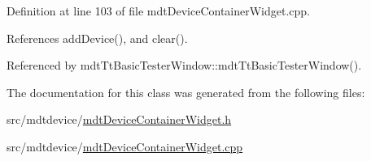 Definition at line 103 of file mdt\-Device\-Container\-Widget.\-cpp.



References add\-Device(), and clear().



Referenced by mdt\-Tt\-Basic\-Tester\-Window\-::mdt\-Tt\-Basic\-Tester\-Window().



The documentation for this class was generated from the following files\-:\begin{DoxyCompactItemize}
\item 
src/mdtdevice/\hyperlink{mdt_device_container_widget_8h}{mdt\-Device\-Container\-Widget.\-h}\item 
src/mdtdevice/\hyperlink{mdt_device_container_widget_8cpp}{mdt\-Device\-Container\-Widget.\-cpp}\end{DoxyCompactItemize}
